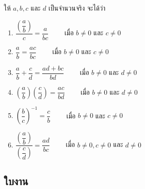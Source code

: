 \begin{theorembox}
ให้ $a, b, c$ และ $d$ เป็นจำนวนจริง จะได้ว่า

\begin{enumerate}
	\item $\dfrac{\left(\dfrac{a}{b}\right)}{c} = \dfrac{a}{bc} \qquad$ เมื่อ $b \neq 0$ และ $c \neq 0$
	
	\item $\dfrac{a}{b} = \dfrac{ac}{bc} \qquad$ เมื่อ $b \neq 0$ และ $c \neq 0$
	
	\item $\dfrac{a}{b} + \dfrac{c}{d} = \dfrac{ad + bc}{bd} \qquad$ เมื่อ $b \neq 0$ และ $d \neq 0$
	
	\item $\left(\dfrac{a}{b}\right)\left(\dfrac{c}{d}\right) = \dfrac{ac}{bd} \qquad$ เมื่อ $b \neq 0$ และ $d \neq 0$
	
	\item $\left(\dfrac{b}{c}\right)^{-1} = \dfrac{c}{b} \qquad$ เมื่อ $b \neq 0$ และ $c \neq 0$
	
	\item $\dfrac{\left(\dfrac{a}{b}\right)}{\left(\dfrac{c}{d}\right)} = \dfrac{ad}{bc} \qquad$ เมื่อ $b \neq 0, c \neq 0$ และ $d \neq 0$
\end{enumerate}
\end{theorembox}

\newpage
\subsection*{ใบงาน}

